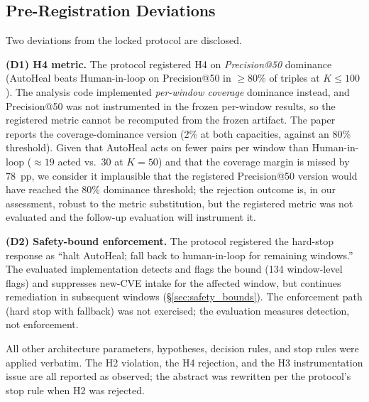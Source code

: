 \subsection{Pre-Registration Deviations}
\label{sec:deviations}

Two deviations from the locked protocol are disclosed.

\textbf{(D1) H4 metric.} The protocol registered H4 on
\emph{Precision@50} dominance (AutoHeal beats Human-in-loop on
Precision@50 in $\geq 80\%$ of triples at $K \leq 100$). The
analysis code implemented \emph{per-window coverage} dominance
instead, and Precision@50 was not instrumented in the frozen
per-window results, so the registered metric cannot be recomputed
from the frozen artifact. The paper reports the coverage-dominance
version (2\% at both capacities, against an 80\% threshold). Given
that AutoHeal acts on fewer pairs per window than Human-in-loop
($\approx 19$ acted vs.\ 30 at $K = 50$) and that the coverage
margin is missed by 78~pp, we consider it implausible that the
registered Precision@50 version would have reached the 80\%
dominance threshold; the rejection outcome is, in our assessment,
robust to the metric substitution, but the registered metric was
not evaluated and the follow-up evaluation will instrument it.

\textbf{(D2) Safety-bound enforcement.} The protocol registered the
hard-stop response as ``halt AutoHeal; fall back to human-in-loop
for remaining windows.'' The evaluated implementation detects and
flags the bound (134 window-level flags) and suppresses new-CVE
intake for the affected window, but continues remediation in
subsequent windows (\S\ref{sec:safety_bounds}). The enforcement
path (hard stop with fallback) was not exercised; the evaluation
measures detection, not enforcement.

All other architecture parameters, hypotheses, decision rules, and
stop rules were applied verbatim. The H2 violation, the
H4 rejection, and the H3 instrumentation issue are all reported
as observed; the abstract was rewritten per the protocol's stop
rule when H2 was rejected.
